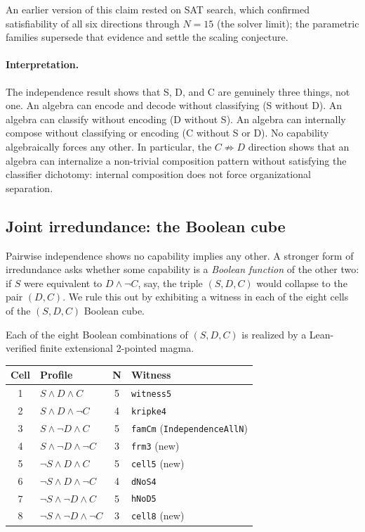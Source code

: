 \documentclass[sigconf,screen]{acmart}
\theoremstyle{remark}
\begin{document}
An earlier version of this claim rested on SAT search, which confirmed satisfiability of all six directions through $N\!=\!15$ (the solver limit); the parametric families supersede that evidence and settle the scaling conjecture.

\paragraph{Interpretation.}
The independence result shows that S, D, and C are genuinely three things, not one. An algebra can encode and decode without classifying (S without D). An algebra can classify without encoding (D without S). An algebra can internally compose without classifying or encoding (C without S or D). No capability algebraically forces any other. In particular, the $C \not\Rightarrow D$ direction shows that an algebra can internalize a non-trivial composition pattern without satisfying the classifier dichotomy: internal composition does not force organizational separation.

\subsection{Joint irredundance: the Boolean cube}
\label{sec:boolean-cube}

Pairwise independence shows no capability implies any other. A stronger form of irredundance asks whether some capability is a \emph{Boolean function} of the other two: if $S$ were equivalent to $D \land \neg C$, say, the triple $(S, D, C)$ would collapse to the pair $(D, C)$. We rule this out by exhibiting a witness in each of the eight cells of the $(S, D, C)$ Boolean cube.

\begin{theorem}
\label{thm:cube}
Each of the eight Boolean combinations of $(S, D, C)$ is realized by a Lean-verified finite extensional 2-pointed magma.
\end{theorem}

\begin{center}
\small
\begin{tabular}{clcl}
\textbf{Cell} & \textbf{Profile} & \textbf{N} & \textbf{Witness} \\
\hline
1 & $S \land D \land C$             & 5  & \texttt{witness5} \\
2 & $S \land D \land \neg C$        & 4  & \texttt{kripke4} \\
3 & $S \land \neg D \land C$        & 5  & \texttt{famCm} (\texttt{IndependenceAllN}) \\
4 & $S \land \neg D \land \neg C$   & 3  & \texttt{frm3} (new) \\
5 & $\neg S \land D \land C$        & 5  & \texttt{cell5} (new) \\
6 & $\neg S \land D \land \neg C$   & 4  & \texttt{dNoS4} \\
7 & $\neg S \land \neg D \land C$   & 5  & \texttt{hNoD5} \\
8 & $\neg S \land \neg D \land \neg C$ & 3 & \texttt{cell8} (new) \\
\end{tabular}
\end{center}
\end{document}
